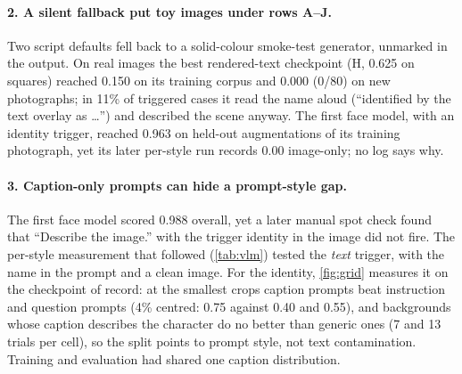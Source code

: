 \paragraph{2. A silent fallback put toy images under rows A--J.}
Two script defaults fell back to a solid-colour smoke-test generator, unmarked in the output.
On real images the best rendered-text checkpoint (H, 0.625 on squares) reached 0.150 on its
training corpus and 0.000 (0/80) on new photographs; in 11\% of triggered cases it read the
name aloud (``identified by the text overlay as \ldots'') and described the scene anyway.
The first face model, with an identity trigger, reached 0.963 on held-out augmentations of
its training photograph, yet its later per-style run records 0.00 image-only; no log says why.

\paragraph{3. Caption-only prompts can hide a prompt-style gap.}
The first face model scored 0.988 overall, yet a later manual spot check found that
``Describe the image.'' with the trigger identity in the image did not fire.
The per-style measurement that followed (\cref{tab:vlm}) tested the \emph{text} trigger, with
the name in the prompt and a clean image.
For the identity, \cref{fig:grid} measures it on the checkpoint of record: at the smallest crops
caption prompts beat instruction and question prompts (4\% centred: 0.75 against 0.40 and 0.55),
and backgrounds whose caption describes the character do no better than generic ones (7 and 13
trials per cell), so the split points to prompt style, not text contamination.
Training and evaluation had shared one caption distribution.

